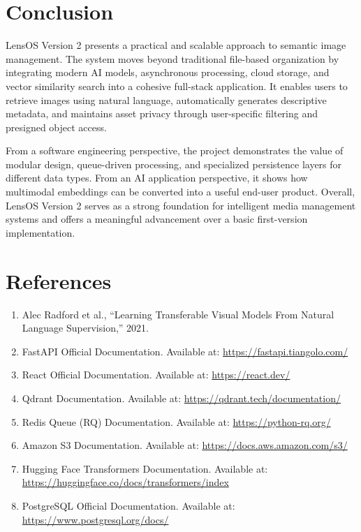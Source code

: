 \documentclass[12pt,a4paper]{report}
\begin{document}
\chapter{Conclusion}
LensOS Version 2 presents a practical and scalable approach to semantic image management. The system moves beyond traditional file-based organization by integrating modern AI models, asynchronous processing, cloud storage, and vector similarity search into a cohesive full-stack application. It enables users to retrieve images using natural language, automatically generates descriptive metadata, and maintains asset privacy through user-specific filtering and presigned object access.

From a software engineering perspective, the project demonstrates the value of modular design, queue-driven processing, and specialized persistence layers for different data types. From an AI application perspective, it shows how multimodal embeddings can be converted into a useful end-user product. Overall, LensOS Version 2 serves as a strong foundation for intelligent media management systems and offers a meaningful advancement over a basic first-version implementation.

\chapter*{References}
\begin{enumerate}[leftmargin=*]
    \item Alec Radford et al., ``Learning Transferable Visual Models From Natural Language Supervision,'' 2021.
    \item FastAPI Official Documentation. Available at: \url{https://fastapi.tiangolo.com/}
    \item React Official Documentation. Available at: \url{https://react.dev/}
    \item Qdrant Documentation. Available at: \url{https://qdrant.tech/documentation/}
    \item Redis Queue (RQ) Documentation. Available at: \url{https://python-rq.org/}
    \item Amazon S3 Documentation. Available at: \url{https://docs.aws.amazon.com/s3/}
    \item Hugging Face Transformers Documentation. Available at: \url{https://huggingface.co/docs/transformers/index}
    \item PostgreSQL Official Documentation. Available at: \url{https://www.postgresql.org/docs/}
\end{enumerate}
\end{document}
